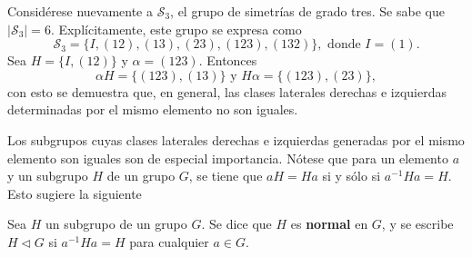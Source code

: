 \begin{ejemplo}
Considérese nuevamente a $\mathcal{S}_3$, el grupo de simetrías de grado tres. Se sabe que $|  \mathcal{S}_3 | = 6$. Explícitamente, este grupo se expresa como \[ \mathcal{S}_3 = \{ I, (12), (13), (23), (123), (132) \}, \mbox{ donde } I = (1) .\]
Sea $H = \{ I, (12) \} $ y $\alpha = (123)$. Entonces \[ \alpha H = \{ (123), (13) \}   \mbox{ y } H\alpha = \{ (123), (23) \} ,\] con esto se demuestra que, en general, las clases laterales derechas e izquierdas determinadas por el mismo elemento no son iguales.
\end{ejemplo}
Los subgrupos cuyas clases laterales derechas e izquierdas generadas por el mismo elemento son iguales son de especial importancia. Nótese que para un elemento $a$ y un subgrupo $H$ de un grupo $G$, se tiene que $aH = Ha$ si y sólo si $a^{-1}Ha=H$. Esto sugiere la siguiente
\begin{definicion}
Sea $H$ un subgrupo de un grupo $G$. Se dice que $H$ es \textbf{normal} en $G$, y se escribe $H \triangleleft G$ si $a^{-1}Ha = H$ para cualquier $a \in G$.
\end{definicion}

